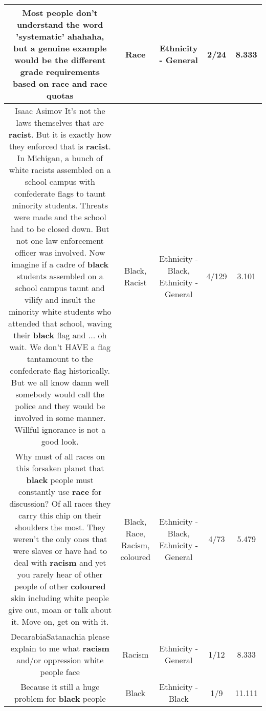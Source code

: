 \documentclass[11pt]{article}
\newlength\mylength
\begin{document}
\begin{center}
\begin{longtable}{|C{.65\mylength}|C{.30\mylength}|C{.12\mylength}|C{.12\mylength}|C{.12\mylength}|}
  \small Most people don't understand the word 'systematic' ahahaha, but a genuine example would be the different grade requirements based on \textbf{race} and \textbf{race} quotas\normalsize   & Race & Ethnicity - General & 2/24 & 8.333 \\  \hline
  \small Isaac Asimov It's not the laws themselves that are \textbf{racist}. But it is exactly how they enforced that is \textbf{racist}. In Michigan, a bunch of white racists assembled on a school campus with confederate flags to taunt minority students. Threats were made and the school had to be closed down. But not one law enforcement officer was involved.  Now imagine if a cadre of \textbf{black} students assembled on a school campus taunt and vilify and insult the minority white students who attended that school, waving their \textbf{black} flag and ... oh wait.  We don't HAVE a flag tantamount to the confederate flag historically.  But we all know damn well somebody would call the police and they would be involved in some manner.  Willful ignorance is not a good look.\normalsize   & Black, Racist & Ethnicity - Black, Ethnicity - General & 4/129 & 3.101 \\  \hline
  \small Why must of all races on this forsaken planet that \textbf{black} people must constantly use \textbf{race} for discussion? Of all races they carry this chip on their shoulders the most. They weren't the only ones that were slaves or have had to deal with \textbf{racism} and yet you rarely hear of other people of other \textbf{coloured} skin including white people give out, moan or talk about it. Move on, get on with it.\normalsize   & Black, Race, Racism, coloured & Ethnicity - Black, Ethnicity - General & 4/73 & 5.479 \\  \hline
  \small DecarabiaSatanachia please explain to me what \textbf{racism} and/or oppression white people face\normalsize   & Racism & Ethnicity - General & 1/12 & 8.333 \\  \hline
  \small Because it still a huge problem for \textbf{black} people\normalsize   & Black & Ethnicity - Black & 1/9 & 11.111 \\  \hline

\end{longtable}
\end{center}
\end{document}
